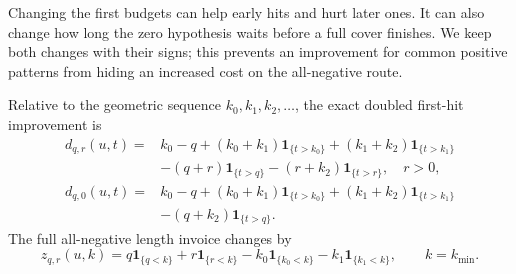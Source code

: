 Changing the first budgets can help early hits and hurt later ones.
It can also change how long the zero hypothesis waits before a
full cover finishes. We keep both changes with their signs; this
prevents an improvement for common positive patterns from hiding
an increased cost on the all-negative route.
\begin{claim}
\label{clm:expected-initial-budget-correction}
Relative to the geometric sequence $k_0,k_1,k_2,\ldots$, the exact
doubled first-hit improvement is
\begin{equation}\label{eq:two-phase-correction}
 \begin{aligned}
 d_{q,r}(u,t)={}&k_0-q+(k_0+k_1)\mathbf1_{\{t>k_0\}}
                    +(k_1+k_2)\mathbf1_{\{t>k_1\}}\\
 &-(q+r)\mathbf1_{\{t>q\}}-(r+k_2)\mathbf1_{\{t>r\}},\quad r>0,\\
 d_{q,0}(u,t)={}&k_0-q+(k_0+k_1)\mathbf1_{\{t>k_0\}}
                    +(k_1+k_2)\mathbf1_{\{t>k_1\}}\\
 &-(q+k_2)\mathbf1_{\{t>q\}}.
 \end{aligned}
\end{equation}
The full all-negative length invoice changes by
\begin{equation}\label{eq:two-phase-zero-correction}
 z_{q,r}(u,k)=q\mathbf1_{\{q<k\}}+r\mathbf1_{\{r<k\}}
             -k_0\mathbf1_{\{k_0<k\}}-k_1\mathbf1_{\{k_1<k\}},
 \qquad k=k_{\min}.
\end{equation}
\end{claim}

